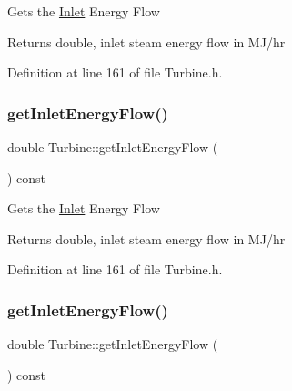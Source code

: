 Gets the \hyperlink{class_inlet}{Inlet} Energy Flow

\begin{DoxyReturn}{Returns}
double, inlet steam energy flow in M\+J/hr 
\end{DoxyReturn}


Definition at line 161 of file Turbine.\+h.

\mbox{\label{class_turbine_ae5d55a7b882e4780d490d43409f8f06c}} 
\subsubsection{\texorpdfstring{get\+Inlet\+Energy\+Flow()}{getInletEnergyFlow()}\hspace{0.1cm}{\footnotesize\ttfamily [2/3]}}
{\footnotesize\ttfamily double Turbine\+::get\+Inlet\+Energy\+Flow (\begin{DoxyParamCaption}{ }\end{DoxyParamCaption}) const\hspace{0.3cm}{\ttfamily [inline]}}

Gets the \hyperlink{class_inlet}{Inlet} Energy Flow

\begin{DoxyReturn}{Returns}
double, inlet steam energy flow in M\+J/hr 
\end{DoxyReturn}


Definition at line 161 of file Turbine.\+h.

\mbox{\label{class_turbine_ae5d55a7b882e4780d490d43409f8f06c}} 
\subsubsection{\texorpdfstring{get\+Inlet\+Energy\+Flow()}{getInletEnergyFlow()}\hspace{0.1cm}{\footnotesize\ttfamily [3/3]}}
{\footnotesize\ttfamily double Turbine\+::get\+Inlet\+Energy\+Flow (\begin{DoxyParamCaption}{ }\end{DoxyParamCaption}) const\hspace{0.3cm}{\ttfamily [inline]}}


